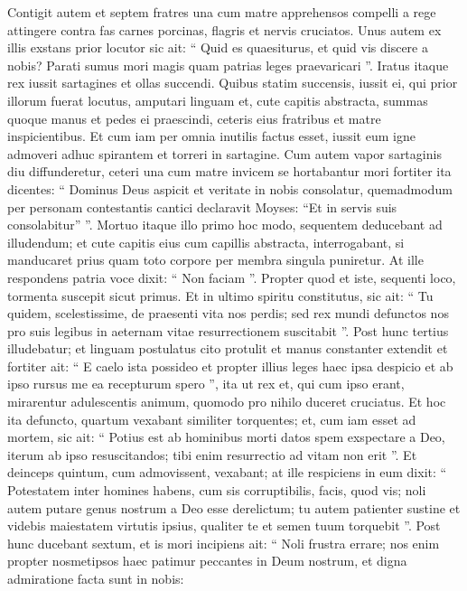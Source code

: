 \begin{biblechapter}
\begin{biblechapter}
\begin{biblechapter}
\begin{biblechapter}
\begin{biblechapter}
\begin{biblechapter}
\begin{biblechapter}
\verse Contigit autem et septem fratres una cum matre apprehensos compelli a rege attingere contra fas carnes porcinas, flagris et nervis cruciatos. 
\verse Unus autem ex illis exstans prior locutor sic ait: “ Quid es quaesiturus, et quid vis discere a nobis? Parati sumus mori magis quam patrias leges praevaricari ”. 
\verse Iratus itaque rex iussit sartagines et ollas succendi. 
\verse Quibus statim succensis, iussit ei, qui prior illorum fuerat locutus, amputari linguam et, cute capitis abstracta, summas quoque manus et pedes ei praescindi, ceteris eius fratribus et matre inspicientibus. 
\verse Et cum iam per omnia inutilis factus esset, iussit eum igne admoveri adhuc spirantem et torreri in sartagine. Cum autem vapor sartaginis diu diffunderetur, ceteri una cum matre invicem se hortabantur mori fortiter ita dicentes: 
\verse “ Dominus Deus aspicit et veritate in nobis consolatur, quemadmodum per personam contestantis cantici declaravit Moyses: “Et in servis suis consolabitur” ”. 
\verse Mortuo itaque illo primo hoc modo, sequentem deducebant ad illudendum; et cute capitis eius cum capillis abstracta, interrogabant, si manducaret prius quam toto corpore per membra singula puniretur. 
\verse At ille respondens patria voce dixit: “ Non faciam ”. Propter quod et iste, sequenti loco, tormenta suscepit sicut primus. 
\verse Et in ultimo spiritu constitutus, sic ait: “ Tu quidem, scelestissime, de praesenti vita nos perdis; sed rex mundi defunctos nos pro suis legibus in aeternam vitae resurrectionem suscitabit ”. 
\verse Post hunc tertius illudebatur; et linguam postulatus cito protulit et manus constanter extendit 
\verse et fortiter ait: “ E caelo ista possideo et propter illius leges haec ipsa despicio et ab ipso rursus me ea recepturum spero ”, 
\verse ita ut rex et, qui cum ipso erant, mirarentur adulescentis animum, quomodo pro nihilo duceret cruciatus. 
\verse Et hoc ita defuncto, quartum vexabant similiter torquentes; 
\verse et, cum iam esset ad mortem, sic ait: “ Potius est ab hominibus morti datos spem exspectare a Deo, iterum ab ipso resuscitandos; tibi enim resurrectio ad vitam non erit ”. 
 \verse Et deinceps quintum, cum admovissent, vexabant; 
\verse at ille respiciens in eum dixit: “ Potestatem inter homines habens, cum sis corruptibilis, facis, quod vis; noli autem putare genus nostrum a Deo esse derelictum; 
\verse tu autem patienter sustine et videbis maiestatem virtutis ipsius, qualiter te et semen tuum torquebit ”. 
\verse Post hunc ducebant sextum, et is mori incipiens ait: “ Noli frustra errare; nos enim propter nosmetipsos haec patimur peccantes in Deum nostrum, et digna admiratione facta sunt in nobis: 

\end{biblechapter}
\end{biblechapter}
\end{biblechapter}
\end{biblechapter}
\end{biblechapter}
\end{biblechapter}
\end{biblechapter}
